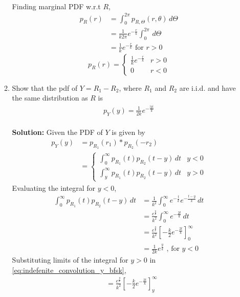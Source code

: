 \documentclass[journal,10pt,twocolumn]{IEEEtran}
\providecommand{\sbrak}[1]{\ensuremath{{}\left[#1\right]}}
\providecommand{\brak}[1]{\ensuremath{\left(#1\right)}}
\providecommand{\abs}[1]{\left\vert#1\right\vert}
\newcommand{\solution}{\noindent \textbf{Solution: }}
\begin{document}
\begin{enumerate}
\begin{enumerate}[label=(\alph{enumii})]
\begin{align}
\end{align}
Finding marginal PDF w.r.t $R$,
\begin{align}
	p_{R}\brak{r} &= \int_{0}^{2\pi} p_{R,\Theta}\brak{r,\theta} \,d\Theta\\
	&= \frac{1}{k2\pi}e^{-\frac{r}{k}} \int_{0}^{2\pi} \,d\Theta\\
	&= \frac{1}{k}e^{-\frac{r}{k}} \text{ for $r > 0$}
\end{align}
\begin{equation}
	p_{R}\brak{r} = 
	\begin{cases}
		\frac{1}{k} e^{-\frac{r}{k}} & r > 0\\
		0 & r < 0
	\end{cases}
	\label{eq:noncoh_bfsk_pdf_y}
\end{equation}
%
\item
Show that the pdf of $Y = R_1-R_2$, where $R_1$ and $R_2$ are i.i.d. and have the same distribution as $R$ is
%
\begin{align}
p_{Y}(y) = \frac{1}{2k}e^{-\frac{\abs{y}}{k}}
\end{align}\\
\solution Given the PDF of $Y$ is given by
\begin{align}
	p_{Y}\brak{y} &= p_{R_1}\brak{r_1} \ast p_{R_2}\brak{-r_2}\\
	&=
	\begin{cases}
		\int_{0}^{\infty} p_{R_1}\brak{t} p_{R_2}\brak{t-y}  \,dt & y < 0\\
		\int_{y}^{\infty} p_{R_1}\brak{t} p_{R_2}\brak{t-y}  \,dt & y > 0
	\end{cases}
\end{align}
Evaluating the integral for $y < 0$,
\begin{align}
	\int_{0}^{\infty} p_{R_1}\brak{t} p_{R_2}\brak{t-y}  \,dt &= \frac{1}{k^2} \int_{0}^{\infty} e^{-\frac{t}{k}}e^{-\frac{t-y}{k}} \,dt\\
	&= \frac{e^{\frac{y}{k}}}{k^2} \int_{0}^{\infty} e^{-\frac{2t}{k}} \,dt\\
	\label{eq:indefenite_convolution_y_bfsk}
	&= \frac{e^{\frac{y}{k}}}{k^2} \sbrak{-\frac{k}{2}e^{-\frac{2t}{k}}}_{0}^{\infty}\\
	\label{eq:noncoh_bfsk_conv_y_p1}
	&= \frac{1}{2k}e^{\frac{y}{k}} \text{ , for $y < 0$}
\end{align}
Substituting limits of the integral for $y > 0$ in \eqref{eq:indefenite_convolution_y_bfsk},
\begin{align}
	&= \frac{e^{\frac{y}{k}}}{k^2} \sbrak{-\frac{k}{2}e^{-\frac{2t}{k}}}_{y}^{\infty}\\

\end{align}
\end{enumerate}
\end{enumerate}
\end{document}
